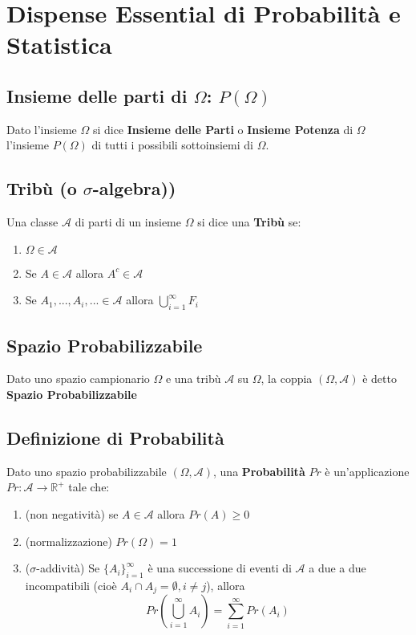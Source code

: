 \documentclass[a4paper]{report}
\begin{document}
  \tableofcontents
  \chapter{Dispense Essential di Probabilità e Statistica}

  \section{Insieme delle parti di $\Omega$: $P(\Omega)$}
  Dato l'insieme $\Omega$ si dice \textbf{Insieme delle Parti} o \textbf{Insieme Potenza} di $\Omega$ l'insieme $P(\Omega)$ di tutti i possibili sottoinsiemi di $\Omega$.

  \section{Tribù (o $\sigma$-algebra))}
  Una classe $\mathcal{A}$ di parti di un insieme $\Omega$ si dice una \textbf{Tribù} se:\\
  \begin{enumerate}
  \item $\Omega \in \mathcal{A}$
  \item Se $A \in \mathcal{A}$ allora $A^c \in \mathcal{A}$
  \item Se $A_1, ... ,A_i, ... \in \mathcal{A}$ allora $\bigcup\limits_{i=1}^{\infty} F_{i}$
  \end{enumerate}

  \section{Spazio Probabilizzabile}
  Dato uno spazio campionario $\Omega$ e una tribù $ \mathcal{A}$ su $\Omega$, la coppia $(\Omega,\mathcal{A})$ è detto \textbf{Spazio Probabilizzabile}

  \section{Definizione di Probabilità}
  Dato uno spazio probabilizzabile $(\Omega,\mathcal{A})$, una \textbf{Probabilità} $Pr$ è un'applicazione $Pr:\mathcal{A} \longrightarrow \mathbb{R}^+$ tale che:
  \begin{enumerate}
    \item (non negatività) se $A \in \mathcal{A}$ allora $Pr(A) \geq 0$
    \item (normalizzazione) $Pr(\Omega) = 1$
    \item ($\sigma$-addività) Se ${\{A_i\}}_{i=1}^{\infty}$ è una successione di eventi di $\mathcal{A}$ a due a due incompatibili (cioè $A_i \cap A_j = \emptyset, i \neq j$), allora
    \[ Pr(\bigcup\limits_{i=1}^{\infty} A_i) = \sum_{i=1}^{\infty} Pr(A_i) \]
  \end{enumerate}
\end{document}
